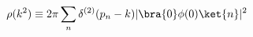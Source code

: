 \begin{equation}
\rho (k^2)\equiv 2\pi \sum_n \delta ^{(2)}(p_n -k)|\bra{0} \phi(0)\ket{n}|^2\label{spectral_fn}
\end{equation}

